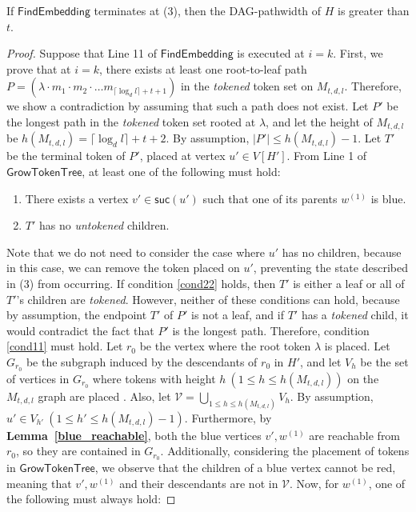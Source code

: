 \documentclass[runningheads]{llncs}
\theoremstyle{plain}
\theoremstyle{definition}
\begin{document}
\begin{lemma}\label{lemma_(3)}
    If $\mathsf{FindEmbedding}$ terminates at (3), then the DAG-pathwidth of $H$ is greater than $t$.
\end{lemma}

\begin{proof}
    Suppose that Line 11 of $\mathsf{FindEmbedding}$ is executed at $i = k$. First, we prove that at $i = k$, there exists at least one root-to-leaf path $P = (\lambda \cdot m_1 \cdot m_2 \cdot \dots m_{\lceil \log_d l \rceil +t+1})$ in the \textit{tokened} token set on $M_{t, d, l}$. Therefore, we show a contradiction by assuming that such a path does not exist. Let $P'$ be the longest path in the \textit{tokened} token set rooted at $\lambda$, and let the height of $M_{t, d, l}$ be $h(M_{t, d, l}) = \lceil \log_d l \rceil +t+2$. By assumption, $|P'| \leq h(M_{t, d, l}) - 1$. Let $T'$ be the terminal token of $P'$, placed at vertex $u' \in V[H']$. From Line 1 of $\mathsf{GrowTokenTree}$, at least one of the following must hold:
    
    \begin{enumerate}
        \item There exists a vertex $v' \in \mathsf{suc}(u')$ such that one of its parents $w^{(1)}$ is blue. \label{cond11}
        \item $T'$ has no \textit{untokened} children. \label{cond22}
    \end{enumerate}
    
    Note that we do not need to consider the case where $u'$ has no children, because in this case, we can remove the token placed on $u'$, preventing the state described in (3) from occurring. If condition \ref{cond22} holds, then $T'$ is either a leaf or all of $T'$'s children are \textit{tokened}. However, neither of these conditions can hold, because by assumption, the endpoint $T'$ of $P'$ is not a leaf, and if $T'$ has a \textit{tokened} child, it would contradict the fact that $P'$ is the longest path. Therefore, condition \ref{cond11} must hold. Let $r_0$ be the vertex where the root token $\lambda$ is placed. Let $G_{r_0}$ be the subgraph induced by the descendants of $r_0$ in $H'$, and let $V_h$ be the set of vertices in $G_{r_0}$ where tokens with height $h\ (1 \leq h \leq h(M_{t, d, l}))$ on the $M_{t, d, l}$ graph are placed . Also, let $\mathcal{V} = \bigcup_{1 \leq h \leq h(M_{t, d, l})} V_h$. By assumption, $u' \in V_{h'}\ (1 \leq h' \leq h(M_{t, d, l})-1)$. Furthermore, by \textbf{Lemma~\ref{blue_reachable}}, both the blue vertices $v', w^{(1)}$ are reachable from $r_0$, so they are contained in $G_{r_0}$. Additionally, considering the placement of tokens in $\mathsf{GrowTokenTree}$, we observe that the children of a blue vertex cannot be red, meaning that $v', w^{(1)}$ and their descendants are not in $\mathcal{V}$. Now, for $w^{(1)}$, one of the following must always hold:


\end{proof}
\end{document}
